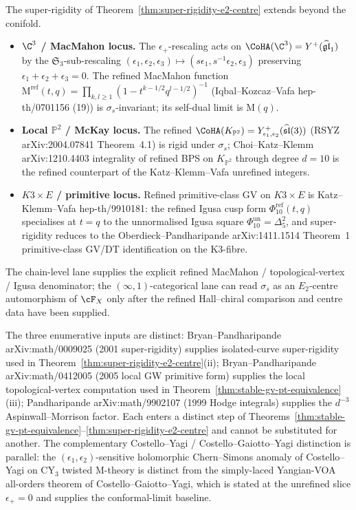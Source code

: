 \begin{remark}
\label{rem:super-rigidity-landscape}
The super-rigidity of Theorem~\ref{thm:super-rigidity-e2-centre}
extends beyond the conifold.
\begin{itemize}
\item \textbf{$\C^{3}$ / MacMahon locus.} The $\epsilon_+$-rescaling
 acts on $\CoHA(\C^{3}) = Y^{+}(\widehat{\mathfrak{gl}}_1)$ by the
 $\mathfrak{S}_3$-sub-rescaling $(\epsilon_1, \epsilon_2, \epsilon_3)
 \mapsto (s\epsilon_1, s^{-1}\epsilon_2, \epsilon_3)$ preserving
 $\epsilon_1 + \epsilon_2 + \epsilon_3 = 0$. The refined MacMahon
 function $\mathrm{M}^{\mathrm{ref}}(t, q) = \prod_{k, l \geq 1}(1 -
 t^{k - 1/2} q^{l - 1/2})^{-1}$ (Iqbal--Kozcaz--Vafa
 \textup{hep-th/0701156} (19)) is $\sigma_s$-invariant; its
 self-dual limit is $\mathrm{M}(q)$.
\item \textbf{Local $\mathbb{P}^2$ / McKay locus.} The refined
 $\CoHA(K_{\mathbb{P}^2}) = Y^{+}_{\epsilon_1, \epsilon_2}(
 \widehat{\mathfrak{sl}}(3))$ (RSYZ \textup{arXiv:2004.07841}
 Theorem~4.1) is rigid under $\sigma_s$; Choi--Katz--Klemm
 \textup{arXiv:1210.4403} integrality of refined BPS on
 $K_{\mathbb{P}^2}$ through degree $d = 10$ is the refined
 counterpart of the Katz--Klemm--Vafa unrefined integers.
\item \textbf{$K3 \times E$ / primitive locus.} Refined primitive-class
 GV on $K3 \times E$ is Katz--Klemm--Vafa
 \textup{hep-th/9910181}: the refined Igusa cusp form
 $\Phi_{10}^{\mathrm{ref}}(t, q)$ specialises at $t = q$ to
 the unnormalised Igusa square $\Phi_{10}^{\mathrm{un}}=\Delta_5^2$,
 and super-rigidity reduces to the
 Oberdieck--Pandharipande \textup{arXiv:1411.1514} Theorem~1
 primitive-class GV/DT identification on the K3-fibre.
\end{itemize}
The chain-level lane supplies the explicit refined MacMahon /
topological-vertex / Igusa denominator; the
$(\infty, 1)$-categorical lane can read $\sigma_s$ as an $E_2$-centre
automorphism of $\cF_X$ only after the refined Hall--chiral comparison
and centre data have been supplied.

The three enumerative inputs are distinct:
Bryan--Pandharipande \textup{arXiv:math/0009025} (2001 super-rigidity)
supplies isolated-curve super-rigidity used in
Theorem~\ref{thm:super-rigidity-e2-centre}(ii); Bryan--Pandharipande
\textup{arXiv:math/0412005} (2005 local GW primitive form) supplies
the local topological-vertex computation used in
Theorem~\ref{thm:stable-gv-pt-equivalence}(iii); Pandharipande
\textup{arXiv:math/9902107} (1999 Hodge integrals) supplies the
$d^{-3}$ Aspinwall--Morrison factor. Each enters a distinct step of
Theorems~\ref{thm:stable-gv-pt-equivalence}--\ref{thm:super-rigidity-e2-centre}
and cannot be substituted for another. The complementary
Costello--Yagi / Costello--Gaiotto--Yagi distinction is parallel: the
$(\epsilon_1, \epsilon_2)$-sensitive holomorphic
Chern--Simons anomaly of Costello--Yagi on CY$_3$ twisted M-theory is
distinct from the simply-laced Yangian-VOA all-orders theorem of
Costello--Gaiotto--Yagi, which is stated at the unrefined slice
$\epsilon_+ = 0$ and supplies the conformal-limit baseline.
\end{remark}
